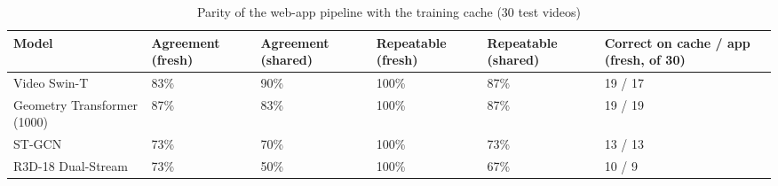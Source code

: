 \begin{table}[htbp]
\caption{Parity of the web-app pipeline with the training cache (30 test videos)}
\label{tab:table05_preprocessing_parity}
\begin{tabular}{llllll}
\toprule
Model & Agreement (fresh) & Agreement (shared) & Repeatable (fresh) & Repeatable (shared) & Correct on cache / app (fresh, of 30) \\
\midrule
Video Swin-T & 83\% & 90\% & 100\% & 87\% & 19 / 17 \\
Geometry Transformer (1000) & 87\% & 83\% & 100\% & 87\% & 19 / 19 \\
ST-GCN & 73\% & 70\% & 100\% & 73\% & 13 / 13 \\
R3D-18 Dual-Stream & 73\% & 50\% & 100\% & 67\% & 10 / 9 \\
\bottomrule
\end{tabular}
\end{table}
